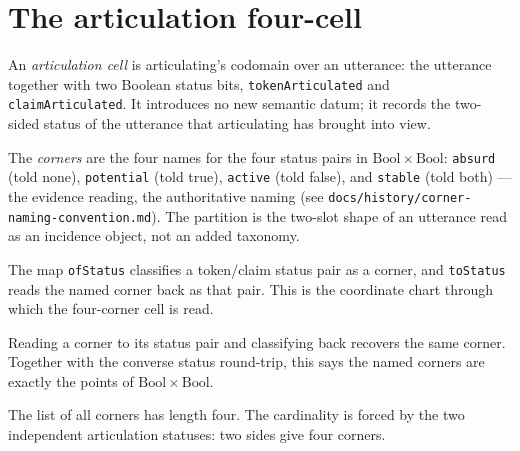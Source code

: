 \section{The articulation four-cell}

\begin{proposition}\label{thm:articulation-cell}\leanok{}
An \emph{articulation cell} is articulating's codomain over an utterance:
the utterance together with two Boolean status bits,
\texttt{tokenArticulated} and \texttt{claimArticulated}. It introduces no
new semantic datum; it records the two-sided status of the utterance that
articulating has brought into view.
\end{proposition}

\begin{proposition}\label{thm:corner}\leanok{}
The \emph{corners} are the four names for the four status pairs in
$\mathrm{Bool}\times\mathrm{Bool}$: \texttt{absurd} (told none),
\texttt{potential} (told true), \texttt{active} (told false), and
\texttt{stable} (told both) — the evidence reading, the authoritative naming
(see \texttt{docs/history/corner-naming-convention.md}). The partition is the
two-slot shape of an utterance read as an incidence object, not an added
taxonomy.
\end{proposition}

\begin{proposition}\label{thm:status-correspondence}\leanok{}
The map \texttt{ofStatus} classifies a token/claim status pair as a corner,
and \texttt{toStatus} reads the named corner back as that pair. This is the
coordinate chart through which the four-corner cell is read.
\end{proposition}

\begin{lemma}\label{thm:corner-iso}\leanok{}
Reading a corner to its status pair and classifying back recovers the same
corner. Together with the converse status round-trip, this says the named
corners are exactly the points of $\mathrm{Bool}\times\mathrm{Bool}$.
\end{lemma}

\begin{theorem}\label{thm:corner-card}\leanok{}
The list of all corners has length four. The cardinality is forced by the
two independent articulation statuses: two sides give four corners.
\end{theorem}

